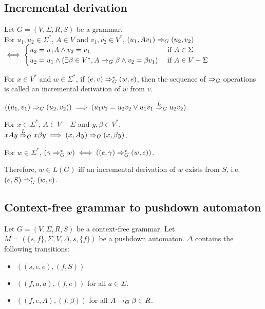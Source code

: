 \subsection{Incremental derivation}

\begin{definition}
Let $G = (V, \Sigma, R, S)$ be a grammar.\\
For $u_1, u_2 \in \Sigma^*$, $A \in V$ and $v_1, v_2 \in V^*$,
$(u_1, Av_1) \Rightarrow_{G} (u_2, v_2)$\\
$\iff \begin{cases}
u_2 = u_1A \wedge v_2 = v_1 & \textrm{ if } A \in \Sigma\\
u_2 = u_1 \wedge
(\exists \beta \in V^*, A \rightarrow_{G} \beta \wedge v_2 = \beta v_1)
& \textrm{ if } A \in V - \Sigma \end{cases}$
\end{definition}

For $x \in V^*$ and $w \in \Sigma^*$, if $(e, v) \Rightarrow_{G}^* (w, e)$,
then the sequence of $\Rightarrow_{G}$ operations
is called an incremental derivation of $w$ from $v$.

\begin{lemma}
$((u_1, v_1) \Rightarrow_{G} (u_2, v_2)) \implies (u_1v_1 = u_2v_2 \vee u_1v_1 \overset{L}{\Rightarrow}_{G} u_2v_2)$
\end{lemma}
\begin{lemma}
For $x \in \Sigma^*$, $A \in V-\Sigma$ and $y, \beta \in V^*$,\\
$xAy \overset{L}{\Rightarrow}_{G} x\beta y \implies (x, Ay) \Rightarrow_{G} (x, \beta y)$.
\end{lemma}
\begin{theorem}
For $w \in \Sigma^*$,
$(\gamma \Rightarrow_{G}^* w) \iff ((e, \gamma) \Rightarrow_{G}^* (w, e))$.
\end{theorem}
Therefore, $w \in L(G)$ iff an incremental derivation of $w$ exists from $S$,
i.e. $(e, S) \Rightarrow_{G}^* (w, e)$.

\subsection{Context-free grammar to pushdown automaton}

Let $G = (V, \Sigma, R, S)$ be a context-free grammar.
Let $M = (\{s, f\}, \Sigma, V, \Delta, s, \{f\})$ be a pushdown automaton.
$\Delta$ contains the following transitions:
\begin{itemize}
\item $((s, e, e), (f, S))$
\item $((f, a, a), (f, e))$ for all $a \in \Sigma$.
\item $((f, e, A), (f, \beta))$ for all $A \rightarrow_{G} \beta \in R$.
\end{itemize}

